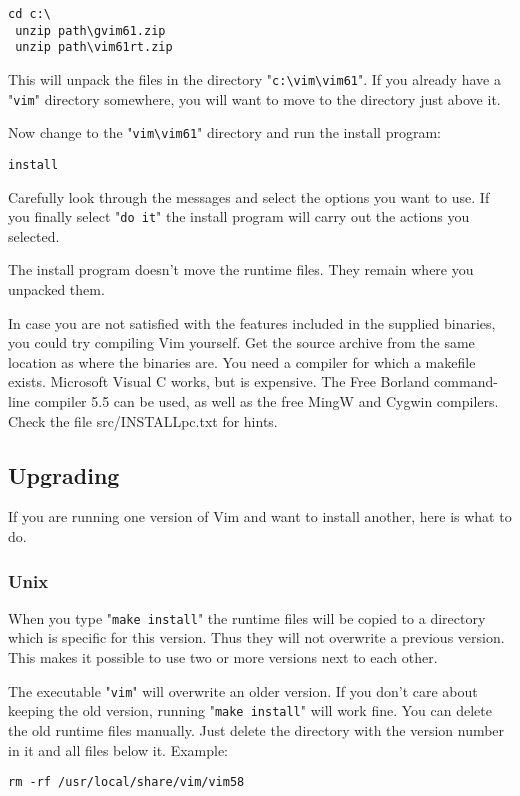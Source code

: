 \begin{Verbatim}[samepage=true]
 cd c:\
 unzip path\gvim61.zip
 unzip path\vim61rt.zip
\end{Verbatim}

This will unpack the files in the directory "\verb!c:\vim\vim61!".
If you already have a "\verb!vim!" directory somewhere, you will want to move to the directory just above it.

Now change to the "\verb!vim\vim61!" directory and run the install program:

\begin{Verbatim}[samepage=true]
 install
\end{Verbatim}

Carefully look through the messages and select the options you want to use.
If you finally select "\verb!do it!" the install program will carry out the actions you selected.

The install program doesn't move the runtime files.
They remain where you unpacked them.

In case you are not satisfied with the features included in the supplied binaries, you could try compiling Vim yourself.
Get the source archive from the same location as where the binaries are.
You need a compiler for which a makefile exists.
Microsoft Visual C works, but is expensive.
The Free Borland command-line compiler 5.5 can be used, as well as the free MingW and Cygwin compilers.
Check the file src/INSTALLpc.txt for hints.
\subsection{Upgrading}
If you are running one version of Vim and want to install another, here is what to do.
\subsubsection{Unix}
When you type "\verb!make install!" the runtime files will be copied to a directory which is specific for this version.
Thus they will not overwrite a previous version.
This makes it possible to use two or more versions next to each other.

The executable "\verb!vim!" will overwrite an older version.
If you don't care about keeping the old version, running "\verb!make install!" will work fine.
You can delete the old runtime files manually.
Just delete the directory with the version number in it and all files below it.
Example:

\begin{Verbatim}[samepage=true]
 rm -rf /usr/local/share/vim/vim58
\end{Verbatim}

